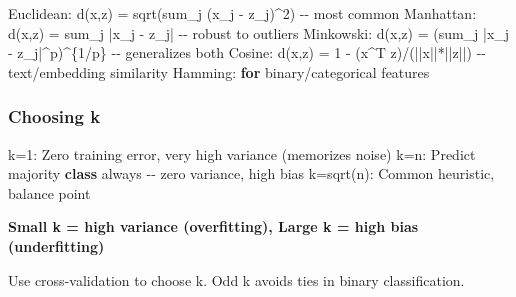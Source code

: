 \documentclass[11pt]{article}
\newenvironment{Shaded}{\begin{snugshade}}{\end{snugshade}}
\newcommand{\ControlFlowTok}[1]{\textcolor[rgb]{0.99,0.74,0.29}{\textbf{#1}}}
\newcommand{\DecValTok}[1]{\textcolor[rgb]{0.96,0.45,0.00}{#1}}
\newcommand{\KeywordTok}[1]{\textcolor[rgb]{0.81,0.81,0.76}{\textbf{#1}}}
\newcommand{\NormalTok}[1]{\textcolor[rgb]{0.81,0.81,0.76}{#1}}
\newcommand{\OperatorTok}[1]{\textcolor[rgb]{0.81,0.81,0.76}{#1}}
\begin{document}

\begin{Shaded}
\begin{Highlighting}[]
\NormalTok{Euclidean: d(x,z) }\OperatorTok{=}\NormalTok{ sqrt(sum\_j (x\_j }\OperatorTok{{-}}\NormalTok{ z\_j)}\OperatorTok{\^{}}\DecValTok{2}\NormalTok{)   }\OperatorTok{{-}{-}}\NormalTok{ most common}
\NormalTok{Manhattan: d(x,z) }\OperatorTok{=}\NormalTok{ sum\_j }\OperatorTok{|}\NormalTok{x\_j }\OperatorTok{{-}}\NormalTok{ z\_j}\OperatorTok{|}            \OperatorTok{{-}{-}}\NormalTok{ robust to outliers}
\NormalTok{Minkowski: d(x,z) }\OperatorTok{=}\NormalTok{ (sum\_j }\OperatorTok{|}\NormalTok{x\_j }\OperatorTok{{-}}\NormalTok{ z\_j}\OperatorTok{|\^{}}\NormalTok{p)}\OperatorTok{\^{}}\NormalTok{\{}\DecValTok{1}\OperatorTok{/}\NormalTok{p\} }\OperatorTok{{-}{-}}\NormalTok{ generalizes both}
\NormalTok{Cosine:    d(x,z) }\OperatorTok{=} \DecValTok{1} \OperatorTok{{-}}\NormalTok{ (x}\OperatorTok{\^{}}\NormalTok{T z)}\OperatorTok{/}\NormalTok{(}\OperatorTok{||}\NormalTok{x}\OperatorTok{||*||}\NormalTok{z}\OperatorTok{||}\NormalTok{)   }\OperatorTok{{-}{-}}\NormalTok{ text}\OperatorTok{/}\NormalTok{embedding similarity}
\NormalTok{Hamming:   }\ControlFlowTok{for}\NormalTok{ binary}\OperatorTok{/}\NormalTok{categorical features}
\end{Highlighting}
\end{Shaded}

\subsubsection{Choosing k}\label{choosing-k}


\begin{Shaded}
\begin{Highlighting}[]
\NormalTok{k}\OperatorTok{=}\DecValTok{1}\NormalTok{:       Zero training error, very high variance (memorizes noise)}
\NormalTok{k}\OperatorTok{=}\NormalTok{n:       Predict majority }\KeywordTok{class}\NormalTok{ always }\OperatorTok{{-}{-}}\NormalTok{ zero variance, high bias}
\NormalTok{k}\OperatorTok{=}\NormalTok{sqrt(n): Common heuristic, balance point}
\end{Highlighting}
\end{Shaded}

\textbf{Small k = high variance (overfitting), Large k = high bias (underfitting)}

Use cross-validation to choose k. Odd k avoids ties in binary classification.
\end{document}
